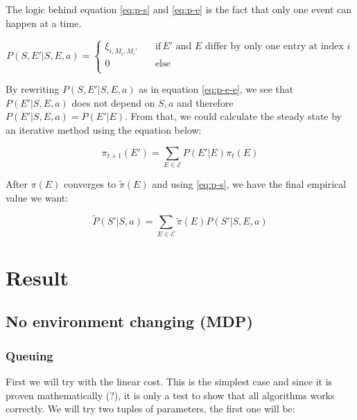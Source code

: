 \documentclass[
  a4paper, xcolor = usenames,dvipsnames]{article}
\theoremstyle{definition}
\theoremstyle{definition}
\theoremstyle{definition}
\theoremstyle{definition}
\theoremstyle{remark}
\begin{document}
The logic behind equation \eqref{eq:p-s} and \eqref{eq:p-e} is the fact that only one event can happen at a time.

\begin{equation}
  P(S, E'|S, E, a) = 
    \begin{cases}
        \xi_{i, M_{i}, M_{i}'} \quad & \text{if} \, E' \text{ and } E \text{ differ by only one entry at index } i \\
        0 \quad & \text{else} \\
    \end{cases}
\label{eq:p-e-e}
\end{equation}

By rewriting \(P(S, E' | S, E, a)\) as in equation \eqref{eq:p-e-e}, we see that \(P(E'|S, E, a)\) does not depend on \(S, a\) and therefore \(P(E'|S, E, a) = P(E'| E)\). From that, we could calculate the steady state by an iterative method using the equation below:

\begin{equation}
\label{eq:steady-prob}
    \pi_{t + 1}(E') = \sum_{E \in \mathcal{E}} P(E'| E) \pi_{t}(E)
\end{equation}

After \(\pi(E)\) converges to \(\tilde{\pi}(E)\) and using \eqref{eq:p-s}, we have the final empirical value we want:

\begin{equation}
\label{eq:p-tilde}
    \tilde{P}(S'| S, a) = \sum_{E \in \mathcal{E}} \tilde{\pi}(E) P(S'| S, E, a)
\end{equation}

\hypertarget{result}{%
\section{Result}\label{result}}

\hypertarget{no-environment-changing-mdp}{%
\subsection{No environment changing (MDP)}\label{no-environment-changing-mdp}}

\hypertarget{queuing}{%
\subsubsection{Queuing}\label{queuing}}

First we will try with the linear cost. This is the simplest case and since it is proven mathematically (?), it is only a test to show that all algorithms works correctly. We will try two tuples of parameters, the first one will be:
\end{document}
